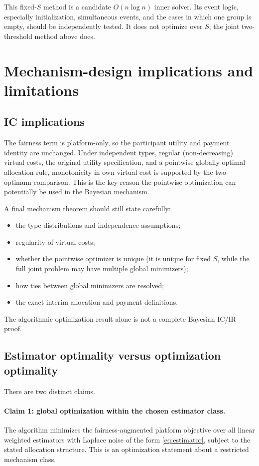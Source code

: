 \documentclass[11pt,a4paper]{article}
\newcommand{\1}{\mathbf{1}}
\begin{document}
This fixed-\(S\) method is a candidate \(O(n\log n)\) inner solver.
Its event logic, especially initialization, simultaneous events, and
the cases in which one group is empty, should be independently tested.
It does not optimize over \(S\); the joint two-threshold method above
does.

\section{Mechanism-design implications and limitations}

\subsection{IC implications}

The fairness term is platform-only, so the participant utility and
payment identity are unchanged. Under independent types, regular
(non-decreasing) virtual costs, the original utility specification,
and a pointwise globally optimal allocation rule, monotonicity in own
virtual cost is supported by the two-optimum comparison. This is the
key reason the pointwise optimization can potentially be used in the
Bayesian mechanism.

A final mechanism theorem should still state carefully:
\begin{itemize}
  \item the type distributions and independence assumptions;
  \item regularity of virtual costs;
  \item whether the pointwise optimizer is unique (it is unique for fixed
        \(S\), while the full joint problem may have multiple global
        minimizers);
  \item how ties between global minimizers are resolved;
  \item the exact interim allocation and payment definitions.
\end{itemize}
The algorithmic optimization result alone is not a complete Bayesian
IC/IR proof.

\subsection{Estimator optimality versus optimization optimality}

There are two distinct claims.

\paragraph{Claim 1: global optimization within the chosen estimator class.}
The algorithm minimizes the fairness-augmented platform objective over
all linear weighted estimators with Laplace noise of the form
\eqref{eq:estimator}, subject to the stated allocation structure.
This is an optimization statement about a restricted mechanism class.
\end{document}
